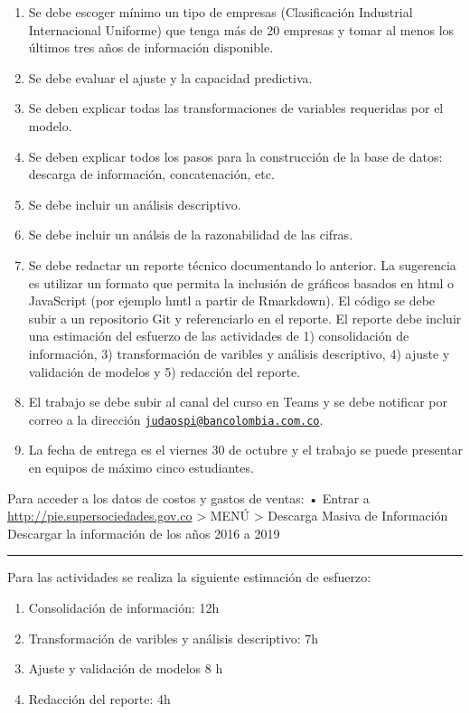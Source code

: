 \documentclass[
  11pt,
]{article}
\providecommand{\tightlist}{%
  \setlength{\itemsep}{0pt}\setlength{\parskip}{0pt}}
\begin{document}
\begin{enumerate}
\def\labelenumi{\arabic{enumi}.}
\setcounter{enumi}{1}
\item
  Se debe escoger mínimo un tipo de empresas (Clasificación Industrial
  Internacional Uniforme) que tenga más de 20 empresas y tomar al menos
  los últimos tres años de información disponible.
\item
  Se debe evaluar el ajuste y la capacidad predictiva.
\item
  Se deben explicar todas las transformaciones de variables requeridas
  por el modelo.
\item
  Se deben explicar todos los pasos para la construcción de la base de
  datos: descarga de información, concatenación, etc.
\item
  Se debe incluir un análisis descriptivo.
\item
  Se debe incluir un análsis de la razonabilidad de las cifras.
\item
  Se debe redactar un reporte técnico documentando lo anterior. La
  sugerencia es utilizar un formato que permita la inclusión de gráficos
  basados en html o JavaScript (por ejemplo hmtl a partir de Rmarkdown).
  El código se debe subir a un repositorio Git y referenciarlo en el
  reporte. El reporte debe incluir una estimación del esfuerzo de las
  actividades de 1) consolidación de información, 3) transformación de
  varibles y análisis descriptivo, 4) ajuste y validación de modelos y
  5) redacción del reporte.
\item
  El trabajo se debe subir al canal del curso en Teams y se debe
  notificar por correo a la dirección
  \href{mailto:judaospi@bancolombia.com.co}{\nolinkurl{judaospi@bancolombia.com.co}}.
\item
  La fecha de entrega es el viernes 30 de octubre y el trabajo se puede
  presentar en equipos de máximo cinco estudiantes.
\end{enumerate}

Para acceder a los datos de costos y gastos de ventas: • Entrar a
\url{http://pie.supersociedades.gov.co} \textgreater{} MENÚ
\textgreater{} Descarga Masiva de Información Descargar la información
de los años 2016 a 2019

\begin{center}\rule{0.5\linewidth}{0.5pt}\end{center}

Para las actividades se realiza la siguiente estimación de esfuerzo:

\begin{enumerate}
\def\labelenumi{\arabic{enumi})}
\tightlist
\item
  Consolidación de información: 12h
\item
  Transformación de varibles y análisis descriptivo: 7h
\item
  Ajuste y validación de modelos 8 h
\item
  Redacción del reporte: 4h
\end{enumerate}
\end{document}
